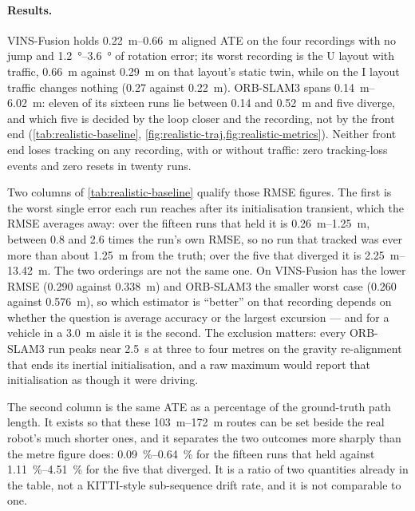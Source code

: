 \documentclass[11pt,a4paper,notitlepage]{report}
\begin{document}
\paragraph{Results.} VINS-Fusion holds \SIrange{0.22}{0.66}{\metre} aligned
ATE on the four recordings with no jump and \SIrange{1.2}{3.6}{\degree} of
rotation error; its worst recording is the U layout with traffic,
\SI{0.66}{\metre} against \SI{0.29}{\metre} on that layout's static twin,
while on the I layout traffic changes nothing (\SI{0.27}{} against
\SI{0.22}{\metre}). ORB-SLAM3 spans \SIrange{0.14}{6.02}{\metre}: eleven of its
sixteen runs lie between \SI{0.14}{} and \SI{0.52}{\metre} and five diverge, and
which five is decided by the loop closer and the recording, not by the front
end (\cref{tab:realistic-baseline}, \cref{fig:realistic-traj,fig:realistic-metrics}).
Neither front end loses tracking on any recording, with or without traffic:
zero tracking-loss events and zero resets in twenty runs.

Two columns of \cref{tab:realistic-baseline} qualify those RMSE figures. The
first is the worst single error each run reaches after its initialisation
transient, which the RMSE averages away: over the fifteen runs that held it is
\SIrange{0.26}{1.25}{\metre}, between \num{0.8} and \num{2.6} times the run's
own RMSE, so no run that tracked was ever more than about
\SI{1.25}{\metre} from the truth; over the five that diverged it is
\SIrange{2.25}{13.42}{\metre}. The two orderings are not the same one. On
 VINS-Fusion has the lower RMSE
(\SI{0.290}{} against \SI{0.338}{\metre}) and ORB-SLAM3 the smaller worst
case (\SI{0.260}{} against \SI{0.576}{\metre}), so which estimator is
``better'' on that recording depends on whether the question is average
accuracy or the largest excursion --- and for a vehicle in a \SI{3.0}{\metre}
aisle it is the second. The exclusion matters: every ORB-SLAM3 run peaks near
\SI{2.5}{\second} at three to four metres on the gravity re-alignment that
ends its inertial initialisation, and a raw maximum would report that
initialisation as though it were driving.

The second column is the same ATE as a percentage of the ground-truth path
length. It exists so that these \SIrange{103}{172}{\metre} routes can be set
beside the real robot's much shorter ones,
and it separates the two outcomes more sharply than
the metre figure does: \SIrange{0.09}{0.64}{\percent} for the fifteen runs
that held against \SIrange{1.11}{4.51}{\percent} for the five that diverged.
It is a ratio of two quantities already in the table, not a KITTI-style
sub-sequence drift rate, and it is not comparable to one.
\end{document}
